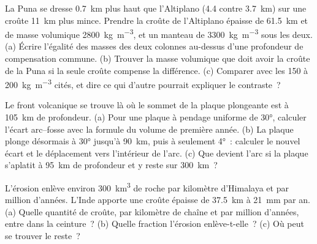 \begin{exercise}[$\star\star\star$]\label{exo:b2:himalaya-andes:10}
La Puna se dresse \qty{0.7}{km} plus haut que l'Altiplano (4.4 contre \qty{3.7}{km}) sur une croûte
\qty{11}{km} plus mince. Prendre la croûte de l'Altiplano épaisse de \qty{61.5}{km} et de masse volumique
\qty{2800}{kg.m^{-3}}, et un manteau de \qty{3300}{kg.m^{-3}} sous les deux. (a) Écrire l'égalité
des masses des deux colonnes au-dessus d'une profondeur de compensation commune. (b) Trouver la masse
volumique que doit avoir la croûte de la Puna si la seule croûte compense la différence. (c) Comparer
avec les 150 à \qty{200}{kg.m^{-3}} cités, et dire ce qui d'autre pourrait expliquer le contraste~?
\end{exercise}

\begin{exercise}[$\star\star\star$]\label{exo:b2:himalaya-andes:11}
Le front volcanique se trouve là où le sommet de la plaque plongeante est à \qty{105}{km} de profondeur.
(a) Pour une plaque à pendage uniforme de \ang{30}, calculer l'écart arc--fosse avec la formule
du volume de première année. (b) La plaque plonge désormais à \ang{30} jusqu'à \qty{90}{km}, puis
à seulement \ang{4}~: calculer le nouvel écart et le déplacement vers l'intérieur de l'arc. (c)
Que devient l'arc si la plaque s'aplatit à \qty{95}{km} de profondeur et y reste sur \qty{300}{km}~?
\end{exercise}

\begin{exercise}[$\star\star\star$]\label{exo:b2:himalaya-andes:12}
L'érosion enlève environ \qty{300}{km^3} de roche par kilomètre d'Himalaya et par million
d'années. L'Inde apporte une croûte épaisse de \qty{37.5}{km} à \qty{21}{mm} par an. (a)
Quelle quantité de croûte, par kilomètre de chaîne et par million d'années, entre dans la
ceinture~? (b) Quelle fraction l'érosion enlève-t-elle~? (c) Où peut se trouver le reste~?
\end{exercise}

